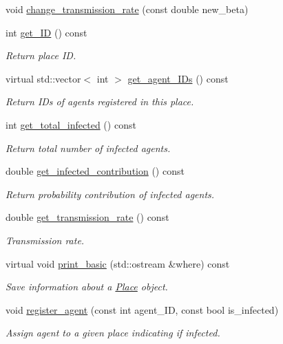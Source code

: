 \begin{DoxyCompactItemize}
void \hyperlink{classPlace_a59594ed1acf114ba3a123bd99d874b65}{change\+\_\+transmission\+\_\+rate} (const double new\+\_\+beta)
\item 
int \hyperlink{classPlace_aec0a7e93c669c5e1f72435e2f9052011}{get\+\_\+\+ID} () const
\begin{DoxyCompactList}\small\item\em Return place ID. \end{DoxyCompactList}\item 
virtual std\+::vector$<$ int $>$ \hyperlink{classPlace_a2f6dbc1e8937c6563b04bbf7dde7e00f}{get\+\_\+agent\+\_\+\+I\+Ds} () const
\begin{DoxyCompactList}\small\item\em Return I\+Ds of agents registered in this place. \end{DoxyCompactList}\item 
int \hyperlink{classPlace_a0f1e45a13137205dd65f6e33a0a110a6}{get\+\_\+total\+\_\+infected} () const
\begin{DoxyCompactList}\small\item\em Return total number of infected agents. \end{DoxyCompactList}\item 
double \hyperlink{classPlace_a8a3cc52898c24655efc92f51512a81ce}{get\+\_\+infected\+\_\+contribution} () const
\begin{DoxyCompactList}\small\item\em Return probability contribution of infected agents. \end{DoxyCompactList}\item 
double \hyperlink{classPlace_a024b5b993c0f566135090a4c3336c24c}{get\+\_\+transmission\+\_\+rate} () const
\begin{DoxyCompactList}\small\item\em Transmission rate. \end{DoxyCompactList}\item 
virtual void \hyperlink{classPlace_a9aa7649e0b91c5f61a5f71e9ca808fe1}{print\+\_\+basic} (std\+::ostream \&where) const
\begin{DoxyCompactList}\small\item\em Save information about a \hyperlink{classPlace}{Place} object. \end{DoxyCompactList}\item 
void \hyperlink{classPlace_a2e46294c2fd0e871740e3ddab1095296}{register\+\_\+agent} (const int agent\+\_\+\+ID, const bool is\+\_\+infected)
\begin{DoxyCompactList}\small\item\em Assign agent to a given place indicating if infected. \end{DoxyCompactList}\item 

\end{DoxyCompactItemize}
